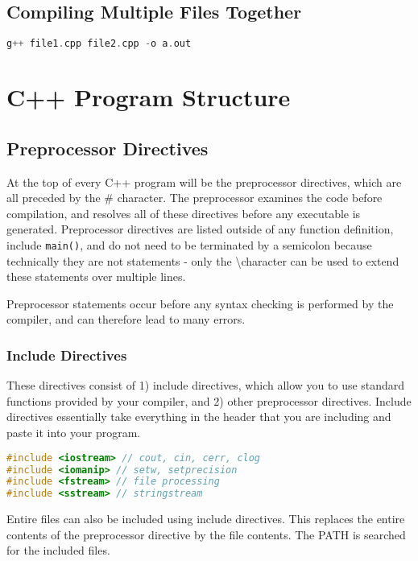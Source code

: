 \documentclass[10pt]{article}
\begin{document}
\subsection{Compiling Multiple Files Together}

\begin{lstlisting}[language=C++]
g++ file1.cpp file2.cpp -o a.out
\end{lstlisting}

\section{C++ Program Structure}

\subsection{Preprocessor Directives}

At the top of every C++ program will be the preprocessor directives, which are all preceded by the \# character. The preprocessor examines the code before compilation, and resolves all of these directives before any executable is generated. Preprocessor directives are listed outside of any function definition, include \texttt{main()}, and do not need to be terminated by a semicolon because technically they are not statements - only the \textbackslash character can be used to extend these statements over multiple lines.

Preprocessor statements occur before any syntax checking is performed by the compiler, and can therefore lead to many errors. 

\subsubsection{Include Directives}

These directives consist of 1) include directives, which allow you to use standard functions provided by your compiler, and 2) other preprocessor directives. Include directives essentially take everything in the header that you are including and paste it into your program. 

\begin{lstlisting}[language=C++]
#include <iostream> // cout, cin, cerr, clog
#include <iomanip> // setw, setprecision
#include <fstream> // file processing
#include <sstream> // stringstream
\end{lstlisting}

Entire files can also be included using include directives. This replaces the entire contents of the preprocessor directive by the file contents. The PATH is searched for the included files. 
\end{document}
